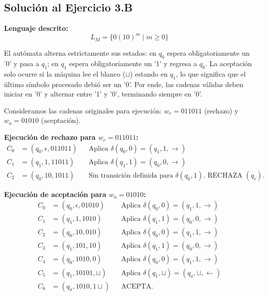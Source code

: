 \subsection{Solución al Ejercicio 3.B}

\textbf{Lenguaje descrito:}
\[ L_M = \{0(10)^m \mid m \geq 0\} \]

El autómata alterna estrictamente sus estados: en $q_0$ espera obligatoriamente un '0' y pasa a $q_1$; en $q_1$ espera obligatoriamente un '1' y regresa a $q_0$. La aceptación solo ocurre si la máquina lee el blanco ($\sqcup$) estando en $q_1$, lo que significa que el último símbolo procesado debió ser un '0'. Por ende, las cadenas válidas deben iniciar en '0' y alternar entre '1' y '0', terminando siempre en '0'.

Consideramos las cadenas originales para ejecución:
$w_r = 011011$ (rechazo) y $w_a = 01010$ (aceptación).

\vspace{0.3cm}
\noindent\textbf{Ejecución de rechazo para $w_r = 011011$:}
\begin{align*}
    C_0 &= (q_0, \epsilon, 011011) && \text{Aplica } \delta(q_0, 0) = (q_1, 1, \to) \\
    C_1 &= (q_1, 1, 11011) && \text{Aplica } \delta(q_1, 1) = (q_0, 0, \to) \\
    C_2 &= (q_0, 10, 1011) && \text{Sin transición definida para } \delta(q_0, 1). \text{ RECHAZA } (q_r).
\end{align*}

\vspace{0.3cm}
\noindent\textbf{Ejecución de aceptación para $w_a = 01010$:}
\begin{align*}
    C_0 &= (q_0, \epsilon, 01010) && \text{Aplica } \delta(q_0, 0) = (q_1, 1, \to) \\
    C_1 &= (q_1, 1, 1010) && \text{Aplica } \delta(q_1, 1) = (q_0, 0, \to) \\
    C_2 &= (q_0, 10, 010) && \text{Aplica } \delta(q_0, 0) = (q_1, 1, \to) \\
    C_3 &= (q_1, 101, 10) && \text{Aplica } \delta(q_1, 1) = (q_0, 0, \to) \\
    C_4 &= (q_0, 1010, 0) && \text{Aplica } \delta(q_0, 0) = (q_1, 1, \to) \\
    C_5 &= (q_1, 10101, \sqcup) && \text{Aplica } \delta(q_1, \sqcup) = (q_a, \sqcup, \leftarrow) \\
    C_6 &= (q_a, 1010, 1\sqcup) && \text{ACEPTA.}
\end{align*}

